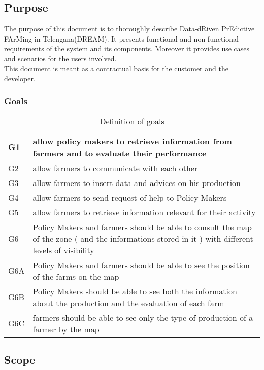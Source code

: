 \subsection{Purpose}
The purpose of this document is to thoroughly describe 
Data-dRiven PrEdictive FArMing in Telengana(DREAM).
It presents functional and non functional requirements of the system and its components.
Moreover it provides use cases and scenarios for the users involved.
\\This document is meant as a contractual basis for the customer and the developer.

\subsubsection{Goals}\label{section:1.1.1}
  \begin{table}[h]
        \centering
  \begin{tabular}{|p{2cm}|p{9cm}|}
    \hline
    G1 & allow policy makers to retrieve information from farmers and to evaluate their performance\\
    \hline
    G2 & allow farmers to communicate with each other\\
    \hline
    G3 & allow farmers to insert data and advices on his production\\
    \hline
    G4 & allow farmers to send request of help to Policy Makers\\
    \hline
    G5 & allow farmers to retrieve information relevant for their activity\\
    \hline
    G6 & Policy Makers and farmers should be able to consult the map of the zone ( and the informations stored in it ) with different levels of visibility\\
    \hline
    G6A & Policy Makers and farmers should be able to see the position of the farms on the map\\
    \hline
    G6B & Policy Makers should be able to see both the information about the production and the evaluation of each farm\\
    \hline
    G6C & farmers should be able to see only the type of production of a farmer by the map\\
    \hline
  \end{tabular}
  \caption{Definition of goals}
\end{table}

\subsection{Scope}

